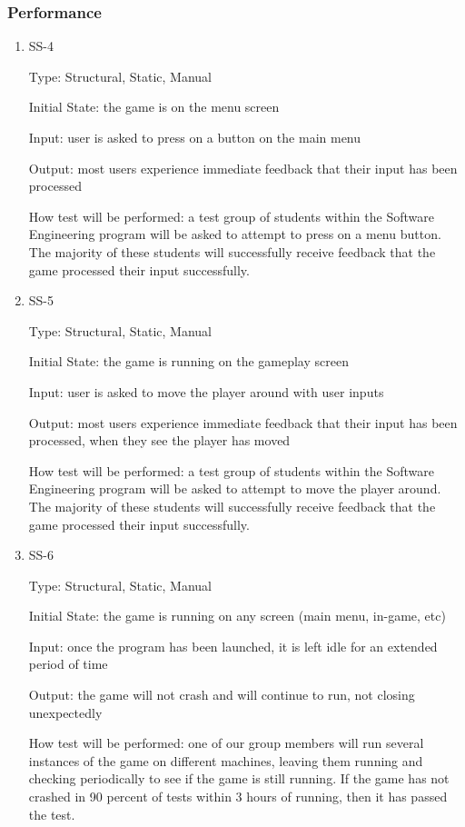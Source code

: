 \documentclass[12pt, titlepage]{article}
\begin{document}
\subsubsection{Performance}

\begin{enumerate}
\item{SS-4}

Type: Structural, Static, Manual
					
Initial State: the game is on the menu screen
					
Input: user is asked to press on a button on the main menu
					
Output: most users experience immediate feedback that their input has been processed
					
How test will be performed: a test group of students within the Software Engineering program will be asked to attempt to press on a menu button. The majority of these students will successfully receive feedback that the game processed their input successfully.

\item{SS-5}

Type: Structural, Static, Manual
					
Initial State: the game is running on the gameplay screen
					
Input: user is asked to move the player around with user inputs
					
Output: most users experience immediate feedback that their input has been processed, when they see the player has moved
					
How test will be performed: a test group of students within the Software Engineering program will be asked to attempt to move the player around. The majority of these students will successfully receive feedback that the game processed their input successfully.

\item{SS-6}

Type: Structural, Static, Manual
					
Initial State: the game is running on any screen (main menu, in-game, etc)
					
Input: once the program has been launched, it is left idle for an extended period of time
					
Output: the game will not crash and will continue to run, not closing unexpectedly 
					
How test will be performed: one of our group members will run several instances of the game on different machines, leaving them running and checking periodically to see if the game is still running. If the game has not crashed in 90 percent of tests within 3 hours of running, then it has passed the test.


\end{enumerate}
\end{document}

